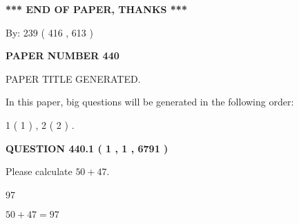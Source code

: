 \documentclass[12pt]{article}
\begin{document}
   
\vspace{1.0in} 
{\textbf{\large{ *** END OF PAPER, THANKS *** }}} 
   
   
\hspace{1.0in} By: 
 239 ( 416 ,  613 )
   
   
   
   
\newpage 
\setcounter{page}{ 
   440001 } 
   
   
   
   
 {\textbf{ \Large{ PAPER NUMBER  440  }}}
   
   
\vspace{0.2in}
   
   
   
   
   
   
   
   
 \vspace{0.2in}
 
 
 
 
   
   
 PAPER TITLE GENERATED.
   
   
   
\vspace{0.2in}
   
In this paper, big questions will be generated in the following order: 
   
   
   1 ( 1 )
 ,
   2 ( 2 )
 .
  
\vspace{0.2in}
  
{\textbf{\Large{QUESTION
440.1 
 ( 1 , 1 , 6791 )
}}}
  
  
 
Please calculate $ %
50 +  %
47 $.
 
 
 
\noindent{}
 
 

97
 
 
\noindent{}
 
 

 
 
 
\noindent{}
 
 

$ %
50 +  %
47=   %
97$
 
\end{document}
